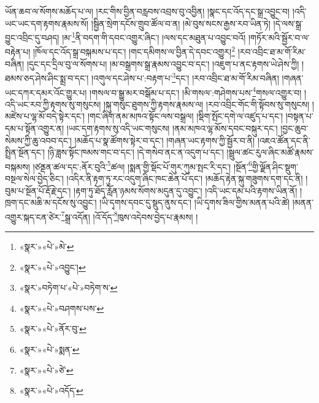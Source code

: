 ཡོན་ཆབ་ལ་སོགས་མཆོད་པ་ལ། །རང་གིས་བྱིན་བརླབས་འབྲས་བུ་འབྱིན། །སྣང་དང་འོད་དང་སྒྲ་འབྱུང་བ། །འདི་ཡང་ཡང་དག་རྟགས་རྣམས་སོ། །སྦྱིན་སྲེག་དངོས་གྲུབ་ཚོལ་བ་ན། །མེ་བུས་སངས་རྒྱས་རབ་ཡིན་ཏེ། །དེ་ལས་སྒྲ་བྱུང་འབྲིང་དུ་བཤད། །མ་\footnote{«སྣར་»«པེ་»མེ་}ནི་བདག་གི་དབང་འགྱུར་ཞིང་། །ལས་དང་མཐུན་པ་འབྱུང་བའོ། །གཏོར་མའི་སྦྱོར་བ་ལ་བརྟེན་པ། །ཁོལ་དང་འོད་སྒྲ་བསྐམས་པ་དང་། །གང་དམིགས་ལ་བྱིན་དེ་དབང་འགྱུར།\footnote{«སྣར་»«པེ་»འབྱུང་།} །རབ་འབྲིང་ཐ་མ་གོ་རིམ་བཞིན། །དུང་དང་དྲིལ་བུ་ལ་སོགས་པ། །མ་བསྒྲགས་སྒྲ་རྣམས་འབྱུང་བ་དང་། །འཇུག་པ་ནང་རྟགས་ཡེ་ཤེས་ཀྱི། །ཐམས་ཅད་ཤེས་ཤིང་སྨྲ་བ་དང་། །འགུལ་དང་ཤེས་པ་:བརྟག་པ་\footnote{«སྣར་»བཏེག་པ་«པེ་»བཏེག་ས་}དང་། །རབ་འབྲིང་ཐ་མ་གོ་རིམ་བཞིན། །གཞན་ཡང་དཀར་དམར་འོང་གྱུར་པ། །གསལ་བ་སྒྱུ་མར་བསྒོམ་པ་དང་། །མི་གསལ་:གཤེགས་པས་\footnote{«སྣར་»«པེ་»བཤགས་པས་}གསལ་འགྱུར་བ། །འདི་ཡང་རབ་ཀྱི་རྟགས་སུ་གསུངས། །སྐུ་གསུང་ཐུགས་ཀྱི་རྟགས་རྣམས་ལ། །རབ་འབྲིང་གོང་གི་སྟོབས་སུ་གསུངས། །མཛེས་པ་ལྷ་མོ་བདེ་སྟེར་དང་། །གང་ཞིག་ནམ་མཁའ་སྟོང་ལས་བསྒྲལ། །སྡིག་སྤོང་དགེ་ལ་འཛུད་པ་དང་། །བསྟན་པ་དམ་པ་སྟོན་འགྱུར་ན། །ཡང་དག་རྟགས་སུ་འདི་ཡང་གསུངས། །ནམ་མཁའ་ལྷ་མོས་དབང་བསྐུར་དང་། །བྱང་ཆུབ་སེམས་ཀྱི་ཆུ་འབབ་དང་། །མཆོད་པ་སྣ་ཚོགས་སྟེར་བ་དང་། །གཞན་ཡང་རྟགས་ཀྱི་སྦྱོར་བ་ནི། །འཇའ་ཚོན་དང་ནི་སྤྲིན་སྔོན་དང་། །ཉི་ཟླས་སྟོང་ཁམས་གང་བ་དང་། །དེ་གསེབ་ནང་ན་འདུག་པ་དང་། །སྦྲུལ་ཚང་རུལ་ཞིང་མཚོ་རྣམས་བསྐམས། །ཙནྡན་ཚལ་དང་:ནོར་བུའི་\footnote{«སྣར་»«པེ་»ནོར་བུ་}ཚལ། །སྨན་གྱི་སྡོང་པོ་གུར་ཀུམ་སྤང་རི་དང་། །སྔོན་\footnote{«སྣར་»«པེ་»སྨན་}གྱི་ལྗོན་ཤིང་སྡུག་བསྔལ་སེལ་བྱེད་ཅིང་། །འདིར་ནི་རྟག་ཏུ་རང་འདུག་ཞིང་ཁང་ཆེན་པོ་དང་། །མཆོད་རྟེན་སྐུ་གཟུགས་དག་དང་ནི། །བུམ་པ་སྔོན་པོ་རྡོ་རྗེ་དང་། །རྟག་ཏུ་ཐོད་རློན་ཉམས་སོགས་མདུན་དུ་འབྱུང་། །འདི་ཡང་དམ་པའི་རྟགས་ཡིན་ནོ། །ཁྲག་དང་མཆི་མ་དངོས་སུ་འབྱུང་། །ཡི་དྭགས་དབང་དུ་སྡུད་ནུས་དང་། །ཡི་དྭགས་ཟིལ་གྱིས་མནན་པའི་ཚེ། །མནན་འགྱུར་སྐད་ངན་ཙེར་\footnote{«སྣར་»«པེ་»ཙེ་}སྒྲ་འདོན། །འོ་དོད་\footnote{«སྣར་»«པེ་»འདོད་}ཁུས་འདེབས་བྱེད་པ་རྣམས། །
